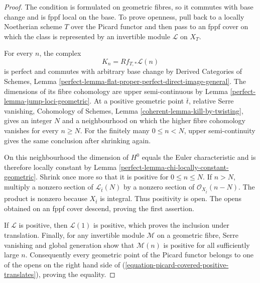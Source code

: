 \begin{proof}
The condition is formulated on geometric fibres, so it commutes with base
change and is fppf local on the base. To prove openness, pull back to a
locally Noetherian scheme $T$ over the Picard functor and then pass to an
fppf cover on which the class is represented by an invertible module
$\mathcal{L}$ on $X_T$.

For every $n$, the complex
$$
K_n = Rf_{T, *}\mathcal{L}(n)
$$
is perfect and commutes with arbitrary base change by Derived Categories of
Schemes, Lemma
\ref{perfect-lemma-flat-proper-perfect-direct-image-general}. The dimensions
of its fibre cohomology are upper semi-continuous by Lemma
\ref{perfect-lemma-jump-loci-geometric}. At a positive geometric point
$\bar t$, relative Serre vanishing, Cohomology of Schemes, Lemma
\ref{coherent-lemma-kill-by-twisting}, gives an integer $N$ and a
neighbourhood on which the higher fibre cohomology vanishes for every
$n \geq N$. For the finitely many $0 \leq n < N$, upper semi-continuity
gives the same conclusion after shrinking again.

On this neighbourhood the dimension of $H^0$ equals the Euler
characteristic and is therefore locally constant by Lemma
\ref{perfect-lemma-chi-locally-constant-geometric}. Shrink once more so that
it is positive for $0 \leq n \leq N$. If $n > N$, multiply a nonzero
section of $\mathcal{L}_{\bar t}(N)$ by a nonzero section of
$\mathcal{O}_{X_{\bar t}}(n - N)$. The product is nonzero because
$X_{\bar t}$ is integral. Thus positivity is open. The opens obtained on an
fppf cover descend, proving the first assertion.

If $\mathcal{L}$ is positive, then $\mathcal{L}(1)$ is positive, which proves
the inclusion under translation. Finally, for any invertible module
$\mathcal{M}$ on a geometric fibre, Serre vanishing and global generation
show that $\mathcal{M}(n)$ is positive for all sufficiently large $n$.
Consequently every geometric point of the Picard functor belongs to one of
the opens on the right hand side of
(\ref{equation-picard-covered-positive-translates}), proving the equality.
\end{proof}

